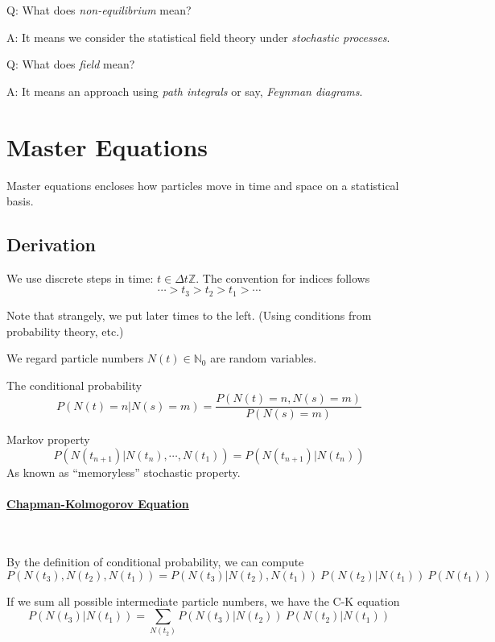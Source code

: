 \documentclass[a4paper,11pt]{article}
\begin{document}
	Q: What does \emph{non-equilibrium} mean? 
	
	A: It means we consider the statistical field theory under \emph{stochastic processes}.

	Q: What does \emph{field} mean? 
	
	A: It means an approach using \emph{path integrals} or say, \emph{Feynman diagrams}.
	\newpage
	\tableofcontents
	\newpage
	\maintext

	\section{Master Equations}

	Master equations encloses how particles move in time and space on a statistical basis.

	\subsection{Derivation}

	We use discrete steps in time: $t \in \Delta t \mathbb{Z}$. The convention for indices follows 
	$$\cdots > t_3 > t_2 > t_1 > \cdots$$

	Note that strangely, we put later times to the left. (Using conditions from probability theory, etc.)

	We regard particle numbers $N(t) \in \mathbb{N}_0$ are random variables.

	The conditional probability
	\[
		P\left(N(t) = n | N(s) = m\right) = \frac{P\left(N(t) = n , N(s) = m\right)}{P\left(N(s) = m\right)}
	\]
	
	Markov property
	\[
		P(N(t_{n+1})| N(t_n), \cdots, N(t_1)) = P(N(t_{n+1})|N(t_n))
	\]
	As known as ``memoryless'' stochastic property.

	\paragraph{\underline{Chapman-Kolmogorov Equation}} 
	\ 

	By the definition of conditional probability, we can compute
	\[
		P(N(t_3), N(t_2), N(t_1)) = P(N(t_3)| N(t_2), N(t_1))\ P(N(t_2)|N(t_1))\ P(N(t_1))
	\]
	
	If we sum all possible intermediate particle numbers, we have the C-K equation
	\begin{equation}
		\boxed{P(N(t_3)| N(t_1)) = \sum_{N(t_2)} P(N(t_3)|N(t_2))\ P(N(t_2)|N(t_1))}
	\end{equation}
	
\end{document}
